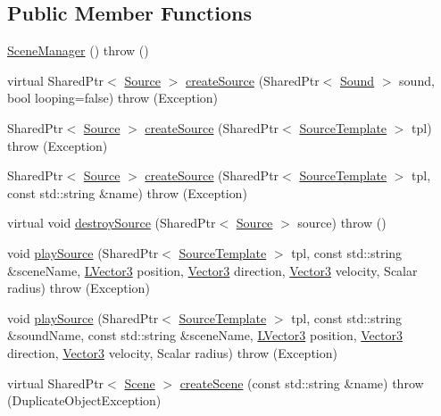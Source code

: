 \subsection*{Public Member Functions}
\begin{DoxyCompactItemize}
\item 
\hyperlink{classAudio_1_1SceneManager_ac1ab0b0b74f49d37cea7b69f9e6b0d6e}{Scene\+Manager} ()  throw ()
\item 
virtual Shared\+Ptr$<$ \hyperlink{classAudio_1_1Source}{Source} $>$ \hyperlink{classAudio_1_1SceneManager_a357857cb8cd5e4793336c613783e4f05}{create\+Source} (Shared\+Ptr$<$ \hyperlink{classAudio_1_1Sound}{Sound} $>$ sound, bool looping=false)  throw (\+Exception)
\item 
Shared\+Ptr$<$ \hyperlink{classAudio_1_1Source}{Source} $>$ \hyperlink{classAudio_1_1SceneManager_a03a6ec7ac5a78034fe418b97eb22bf38}{create\+Source} (Shared\+Ptr$<$ \hyperlink{classAudio_1_1SourceTemplate}{Source\+Template} $>$ tpl)  throw (\+Exception)
\item 
Shared\+Ptr$<$ \hyperlink{classAudio_1_1Source}{Source} $>$ \hyperlink{classAudio_1_1SceneManager_a5b8a90bc4c9245a062f8d9155ef87a2b}{create\+Source} (Shared\+Ptr$<$ \hyperlink{classAudio_1_1SourceTemplate}{Source\+Template} $>$ tpl, const std\+::string \&name)  throw (\+Exception)
\item 
virtual void \hyperlink{classAudio_1_1SceneManager_ab91098a154be588d58eb602868174c58}{destroy\+Source} (Shared\+Ptr$<$ \hyperlink{classAudio_1_1Source}{Source} $>$ source)  throw ()
\item 
void \hyperlink{classAudio_1_1SceneManager_a6fdfe73c13cf5e3a221ed0620028742c}{play\+Source} (Shared\+Ptr$<$ \hyperlink{classAudio_1_1SourceTemplate}{Source\+Template} $>$ tpl, const std\+::string \&scene\+Name, \hyperlink{classAudio_1_1TVector3}{L\+Vector3} position, \hyperlink{classAudio_1_1TVector3}{Vector3} direction, \hyperlink{classAudio_1_1TVector3}{Vector3} velocity, Scalar radius)  throw (\+Exception)
\item 
void \hyperlink{classAudio_1_1SceneManager_a6332f071e6dbc77c85a9bb101aa30fe6}{play\+Source} (Shared\+Ptr$<$ \hyperlink{classAudio_1_1SourceTemplate}{Source\+Template} $>$ tpl, const std\+::string \&sound\+Name, const std\+::string \&scene\+Name, \hyperlink{classAudio_1_1TVector3}{L\+Vector3} position, \hyperlink{classAudio_1_1TVector3}{Vector3} direction, \hyperlink{classAudio_1_1TVector3}{Vector3} velocity, Scalar radius)  throw (\+Exception)
\item 
virtual Shared\+Ptr$<$ \hyperlink{classAudio_1_1Scene}{Scene} $>$ \hyperlink{classAudio_1_1SceneManager_aa6c1a577313a6a1e0adbd474268efc37}{create\+Scene} (const std\+::string \&name)  throw (\+Duplicate\+Object\+Exception)

\end{DoxyCompactItemize}
